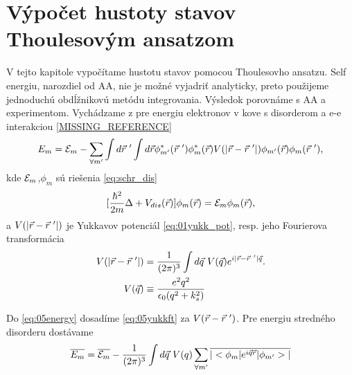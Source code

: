 \section{Výpočet hustoty stavov Thoulesovým ansatzom}
V tejto kapitole vypočítame hustotu stavov pomocou Thoulesovho ansatzu. Self energiu, narozdiel od AA, nie je možné vyjadriť analyticky, preto použijeme jednoduchú obdĺžnikovú metódu integrovania. Výsledok porovnáme s AA a experimentom. Vychádzame z pre energiu elektronov v kove s disorderom a e-e interakciou \eqref{MISSING_REFERENCE}
\begin{align}
\label{eq:05energy} 
 E_m=\E_m-\sum_{\forall m'} \int d\vr\ ' \int d\vr \phi_{m'}^*(\vr\ ')\phi_{m}^*(\vr)V(|\vr-\vr\ '|)\phi_{m'}(\vr)\phi_{m}(\vr\ ')\text{,}
\end{align} 
kde $\mathcal{E}_m$,$\phi_m$  sú riešenia \eqref{eq:schr_dis}
\begin{align}
\label{eq:05schr_dis}
[\frac{\hbar^2}{2m}\Delta+V_{dis}(\vec{r})]\phi_m(\vec{r})=\mathcal{E}_m\phi_m(\vec{r})\text{,}
\end{align}
a $V(|\vr -\vr\ '|)$ je Yukkavov potenciál \eqref{eq:01yukk_pot}, resp. jeho Fourierova transformácia
\begin{align}
\label{eq:05yukkft}
V(|\vr - \vr\ '|) &= \frac{1}{(2\pi)^3}\int d\vq\ V(\vq)e^{i|\vr-\vr\ '|\vq} \text{.} \\
\notag
V(\vq)&\equiv\frac{e^2q^2}{\epsilon_0(q^2+k_s^2)} 
\end{align}

Do \eqref{eq:05energy} dosadíme \eqref{eq:05yukkft} za $V(\vec{r}-\vec{r}\ ')$. Pre energiu stredného disorderu dostávame
\begin{align}
\label{eq:05ergmeandis}
\overline{E_m} =\overline{\mathcal{E}_m} - \frac{1}{(2\pi)^3}\int d\vec{q}\ V(q) \sum_{\forall m'}\overline{|<\phi_m|e^{i\vec{q}\vec{r}}|\phi_{m'}>|}
\end{align}

